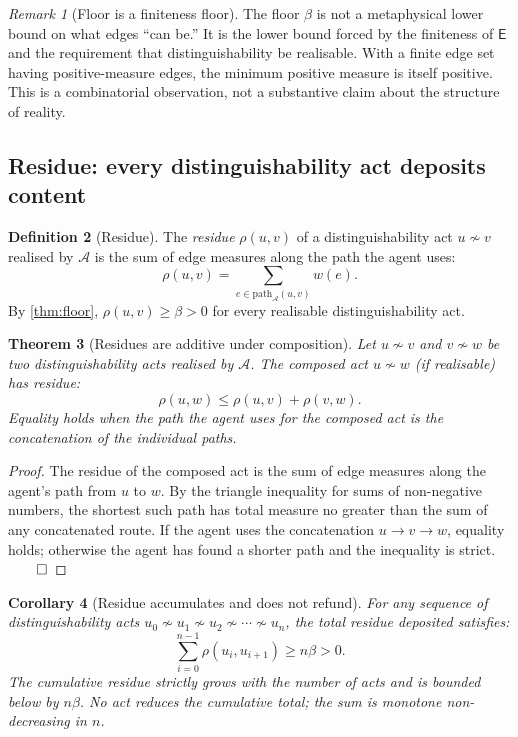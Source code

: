 \documentclass[11pt,a4paper]{article}
\theoremstyle{thmstyle}
\newtheorem{theorem}{Theorem}[section]
\newtheorem{corollary}[theorem]{Corollary}
\theoremstyle{definition}
\newtheorem{definition}[theorem]{Definition}
\theoremstyle{remark}
\newtheorem{remark}[theorem]{Remark}
\newcommand{\Edg}{\mathsf{E}}
\newcommand{\Agent}{\mathcal{A}}
\newcommand{\Res}{\rho}
\newcommand{\floor}{\beta}
\begin{document}
\begin{remark}[Floor is a finiteness floor]
\label{rem:floor_is_finiteness}
The floor $\floor$ is not a metaphysical lower bound on what edges
``can be.'' It is the lower bound forced by the finiteness of
$\Edg$ and the requirement that distinguishability be realisable.
With a finite edge set having positive-measure edges, the minimum
positive measure is itself positive. This is a combinatorial
observation, not a substantive claim about the structure of
reality.
\end{remark}

\subsection{Residue: every distinguishability act deposits content}

\begin{definition}[Residue]
\label{def:residue}
The \emph{residue} $\Res(u,v)$ of a distinguishability act
$u \not\sim v$ realised by $\Agent$ is the sum of edge measures
along the path the agent uses:
\[
  \Res(u,v) = \sum_{e \in \mathrm{path}_\Agent(u,v)} w(e).
\]
By \cref{thm:floor}, $\Res(u,v) \geq \floor > 0$ for every
realisable distinguishability act.
\end{definition}

\begin{theorem}[Residues are additive under composition]
\label{thm:residue_additive}
Let $u \not\sim v$ and $v \not\sim w$ be two distinguishability
acts realised by $\Agent$. The composed act $u \not\sim w$ (if
realisable) has residue:
\[
  \Res(u, w) \leq \Res(u, v) + \Res(v, w).
\]
Equality holds when the path the agent uses for the composed act is
the concatenation of the individual paths.
\end{theorem}

\begin{proof}
The residue of the composed act is the sum of edge measures along
the agent's path from $u$ to $w$. By the triangle inequality for
sums of non-negative numbers, the shortest such path has total
measure no greater than the sum of any concatenated route. If the
agent uses the concatenation $u \to v \to w$, equality holds;
otherwise the agent has found a shorter path and the inequality is
strict. $\qed$
\end{proof}

\begin{corollary}[Residue accumulates and does not refund]
\label{cor:res_accumulate}
For any sequence of distinguishability acts
$u_0 \not\sim u_1 \not\sim u_2 \not\sim \cdots \not\sim u_n$, the
total residue deposited satisfies:
\[
  \sum_{i=0}^{n-1} \Res(u_i, u_{i+1}) \geq n\floor > 0.
\]
The cumulative residue strictly grows with the number of acts and
is bounded below by $n\floor$. No act reduces the cumulative total;
the sum is monotone non-decreasing in $n$.
\end{corollary}
\end{document}
